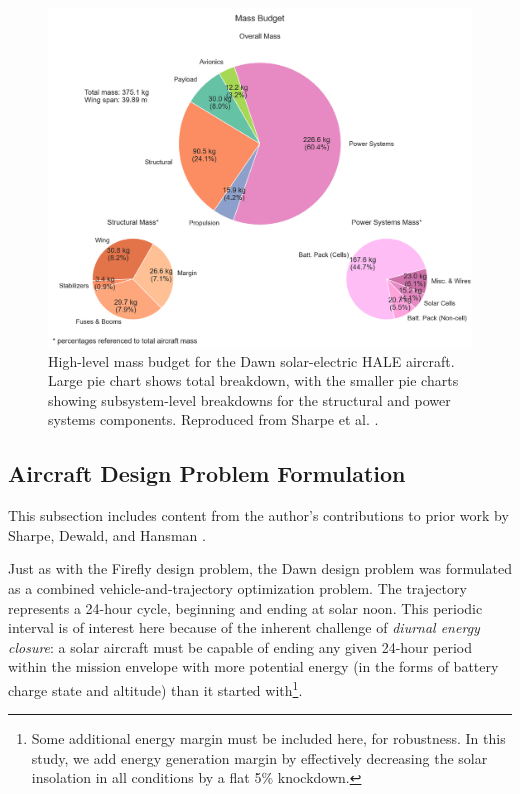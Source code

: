 \begin{figure}[!htbp]
    \centering
    \includegraphics[width=\textwidth]{../figures/dawnfigures/Mass_breakdown_baseline.png}
    \caption{High-level mass budget for the Dawn solar-electric HALE aircraft. Large pie chart shows total breakdown, with the smaller pie charts showing subsystem-level breakdowns for the structural and power systems components. Reproduced from Sharpe et al. \cite{sharpe_optimization_2021}.}
    \label{fig:dawn_mass_budget}
\end{figure}

\subsection{Aircraft Design Problem Formulation}
\label{sec:dawn-mdo}

\begin{attrib}
    This subsection includes content from the author's contributions to prior work by Sharpe, Dewald, and Hansman \cite{sharpe_optimization_2021}.
\end{attrib}

Just as with the Firefly design problem, the Dawn design problem was formulated as a combined vehicle-and-trajectory optimization problem. The trajectory represents a 24-hour cycle, beginning and ending at solar noon. This periodic interval is of interest here because of the inherent challenge of \emph{diurnal energy closure}: a solar aircraft must be capable of ending any given 24-hour period within the mission envelope with more potential energy (in the forms of battery charge state and altitude) than it started with\footnote{Some additional energy margin must be included here, for robustness. In this study, we add energy generation margin by effectively decreasing the solar insolation in all conditions by a flat 5\% knockdown.}.

